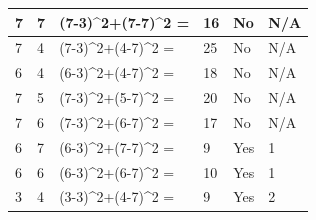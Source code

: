 \documentclass[conference]{IEEEtran}
\begin{document}
\begin{itemize}
\begin{table}[htbp]
\begin{tabular}{llllll}
\hline
7                      & 7                      & (7-3)\textasciicircum{}2+(7-7)\textasciicircum{}2
=
&16                                                                  & No                                                                                  & N/A   \\
\hline
7                      & 4                      & (7-3)\textasciicircum{}2+(4-7)\textasciicircum{}2                                         = & 25                                                                  & No                                                                                  & N/A   \\
\hline
6                      & 4                      & (6-3)\textasciicircum{}2+(4-7)\textasciicircum{}2                                         = & 18                                                                  & No                                                                                  & N/A   \\
\hline
7                      & 5                      & (7-3)\textasciicircum{}2+(5-7)\textasciicircum{}2                                         = & 20                                                                  & No                                                                                  & N/A   \\
\hline
7                      & 6                      & (7-3)\textasciicircum{}2+(6-7)\textasciicircum{}2                                         = & 17                                                                  & No                                                                                  & N/A   \\
\hline
6                      & 7                      & (6-3)\textasciicircum{}2+(7-7)\textasciicircum{}2                                         = & 9                                                                   & Yes                                                                                 & 1     \\
\hline
6                      & 6                      & (6-3)\textasciicircum{}2+(6-7)\textasciicircum{}2                                         = & 10                                                                  & Yes                                                                                 & 1     \\
\hline
3                      & 4                      & (3-3)\textasciicircum{}2+(4-7)\textasciicircum{}2                                         = & 9                                                                   & Yes                                                                                 & 2     \\

\end{tabular}
\end{table}
\end{itemize}
\end{document}
